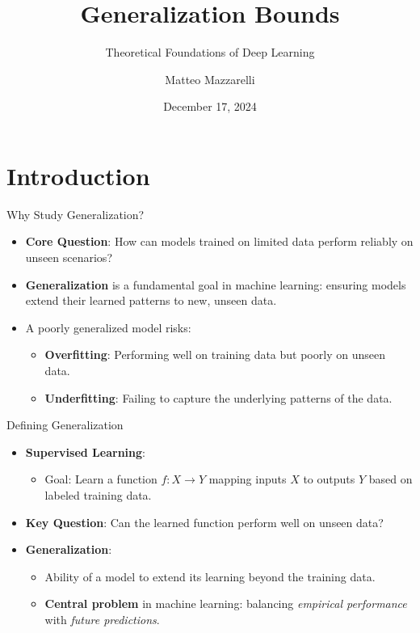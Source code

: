\documentclass[
  ignorenonframetext,
]{beamer}
\title{Generalization Bounds}
\subtitle{Theoretical Foundations of Deep Learning}
\author{Matteo Mazzarelli}
\date{December 17, 2024}
\providecommand{\tightlist}{%
  \setlength{\itemsep}{0pt}\setlength{\parskip}{0pt}}\usepackage{longtable,booktabs,array}
\begin{document}
\frame{\titlepage}


\section{Introduction}\label{introduction}

\begin{frame}{Why Study Generalization?}
\label{why-study-generalization}
\begin{itemize}
\tightlist
\item
  \textbf{Core Question}: How can models trained on limited data perform
  reliably on unseen scenarios?
\item
  \textbf{Generalization} is a fundamental goal in machine learning:
  ensuring models extend their learned patterns to new, unseen data.
\item
  A poorly generalized model risks:

  \begin{itemize}
  \tightlist
  \item
    \textbf{Overfitting}: Performing well on training data but poorly on
    unseen data.
  \item
    \textbf{Underfitting}: Failing to capture the underlying patterns of
    the data.
  \end{itemize}
\end{itemize}
\end{frame}

\begin{frame}{Defining Generalization}
\label{defining-generalization}
\begin{itemize}
\tightlist
\item
  \textbf{Supervised Learning}:

  \begin{itemize}
  \tightlist
  \item
    Goal: Learn a function \(f: X \to Y\) mapping inputs \(X\) to
    outputs \(Y\) based on labeled training data.
  \end{itemize}
\item
  \textbf{Key Question}: Can the learned function perform well on unseen
  data?
\item
  \textbf{Generalization}:

  \begin{itemize}
  \tightlist
  \item
    Ability of a model to extend its learning beyond the training data.
  \item
    \textbf{Central problem} in machine learning: balancing
    \emph{empirical performance} with \emph{future predictions}.
  \end{itemize}
\end{itemize}
\end{frame}
\end{document}
